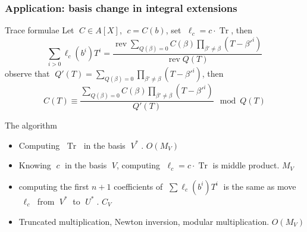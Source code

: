\documentclass[10pt]{beamer}
\DeclareMathOperator{\Tr}{Tr}
\DeclareMathOperator{\rev}{rev}
\begin{document}
\begin{frame}
  \frametitle{Application: basis change in integral extensions}
  
  \vspace{-2mm}
  \begin{block}{Trace formulae}
    Let $\;C\in A[X]$, $\;c=C(b)$, set $\;\ell_c = c\cdot\Tr$, then
    \begin{equation*}
      \sum_{i>0} \ell_c(b^i)T^i = \frac{\rev \sum_{Q(\beta)=0}
        C(\beta)\prod_{\beta'\ne\beta}(T-\beta'^i)}{\rev Q(T)}
    \end{equation*}
    observe that $\;Q'(T) = \sum_{Q(\beta)=0}\prod_{\beta'\ne\beta}(T-\beta'^i)$, then
    \begin{equation*}
      C(T) \equiv \frac{\sum_{Q(\beta)=0}
        C(\beta)\prod_{\beta'\ne\beta}(T-\beta'^i)}{Q'(T)}
      \mod Q(T)
    \end{equation*}
  \end{block}

  \vspace{-2mm}
  \begin{block}{The algorithm}
    \begin{itemize}
    \item Computing $\;\Tr\;$ in the basis $\;V^\ast\;$. \hfill
      \alert{$O(M_V)$}
    \item Knowing $\;c\;$ in the basis $\;V$, computing $\;\ell_c =
      c\cdot \Tr$ is middle product. \hfill\alert{$M_V$}
    \item computing the first $n+1$ coefficients of $\;\sum
      \ell_c(b^i)T^i\;$ is the same as move $\;\ell_c\;$ from
      $\;V^\ast\;$ to $\;U^\ast\;$. \hfill\alert{$C_V$}
    \item Truncated multiplication, Newton inversion, modular
      multiplication. \hfill\alert{$O(M_V)$}
    \end{itemize}
  \end{block}
  
\end{frame}
\end{document}
